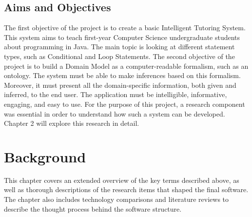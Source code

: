 \documentclass[12pt]{report}
\begin{document}
	\section{Aims and Objectives}
	The first objective of the project is to create a basic Intelligent Tutoring System. This system aims to teach first-year Computer Science undergraduate students about programming in Java. The main topic is looking at different statement types, such as Conditional and Loop Statements.
	\newline
	The second objective of the project is to build a Domain Model as a computer-readable formalism, such as an ontology. The system must be able to make inferences based on this formalism. Moreover, it must present all the domain-specific information, both given and inferred, to the end user.
	\newline
	The application must be intelligible, informative, engaging, and easy to use.
	\newline
	For the purpose of this project, a research component was essential in order to understand how such a system can be developed. Chapter 2 will explore this research in detail.
	
	\chapter{Background}
	This chapter covers an extended overview of the key terms described above, as well as thorough descriptions of the research items that shaped the final software. The chapter also includes technology comparisons and literature reviews to describe the thought process behind the software structure.
	
\end{document}
